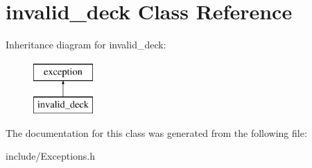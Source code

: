 \hypertarget{classinvalid__deck}{}\section{invalid\+\_\+deck Class Reference}
\label{classinvalid__deck}
Inheritance diagram for invalid\+\_\+deck\+:\begin{figure}[H]
\begin{center}
\leavevmode
\includegraphics[height=2.000000cm]{classinvalid__deck}
\end{center}
\end{figure}


The documentation for this class was generated from the following file\+:\begin{DoxyCompactItemize}
\item 
include/Exceptions.\+h\end{DoxyCompactItemize}
